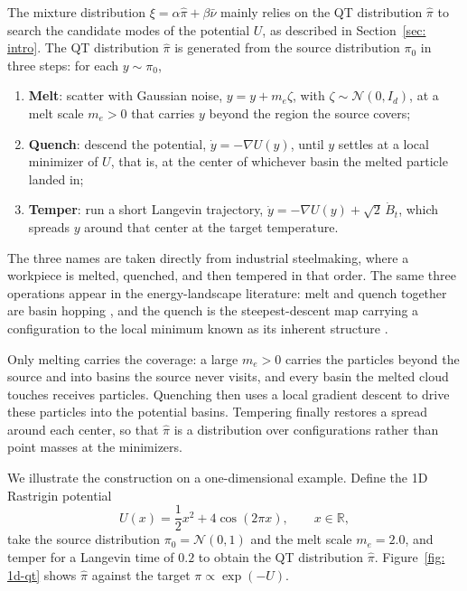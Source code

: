\documentclass{article}
\begin{document}
The mixture distribution $\xi = \alpha\hat\pi+\beta\bar\nu$ mainly relies on the QT distribution $\hat\pi$ to search the candidate modes of the potential $U$, as described in Section~\ref{sec: intro}. The QT distribution $\hat\pi$ is generated from the source distribution $\pi_0$ in three steps: for each $y\sim \pi_0$,
\begin{enumerate}
	\setlength{\itemsep}{0pt}
	\item \textbf{Melt}: scatter with Gaussian noise, $y = y+m_e\zeta$, with $\zeta\sim \mathcal N(0,I_d)$, at a melt scale $m_e>0$ that carries $y$ beyond the region the source covers;
	\item \textbf{Quench}: descend the potential, $\dot y = -\nabla U(y)$, until $y$ settles at a local minimizer of $U$, that is, at the center of whichever basin the melted particle landed in;
	\item \textbf{Temper}: run a short Langevin trajectory, $\dot y = -\nabla U(y)+\sqrt 2\,\dot B_t$, which spreads $y$ around that center at the target temperature.
\end{enumerate}
The three names are taken directly from industrial steelmaking, where a workpiece is melted, quenched, and then tempered in that order. The same three operations appear in the energy-landscape literature: melt and quench together are basin hopping \citep{wales1997global}, and the quench is the steepest-descent map carrying a configuration to the local minimum known as its inherent structure \citep{stillinger1982hidden}.

Only melting carries the coverage: a large $m_e>0$ carries the particles beyond the source and into basins the source never visits, and every basin the melted cloud touches receives particles. Quenching then uses a local gradient descent to drive these particles into the potential basins. Tempering finally restores a spread around each center, so that $\hat\pi$ is a distribution over configurations rather than point masses at the minimizers.

We illustrate the construction on a one-dimensional example. Define the 1D Rastrigin potential
\begin{equation*}
	U(x) = \frac12x^2+4\cos(2\pi x), \qquad x\in \mathbb R,
\end{equation*}
take the source distribution $\pi_0 = \mathcal N(0,1)$ and the melt scale $m_e=2.0$, and temper for a Langevin time of $0.2$ to obtain the QT distribution $\hat\pi$. Figure~\ref{fig: 1d-qt} shows $\hat\pi$ against the target $\pi\propto\exp(-U)$.
\end{document}
